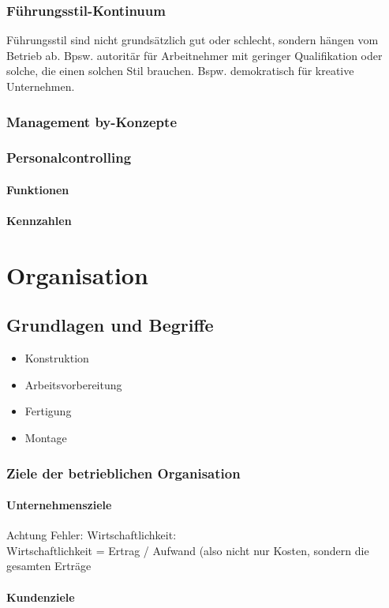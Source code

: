 \subsection{Führungsstil-Kontinuum}
Führungsstil sind nicht grundsätzlich gut oder schlecht, sondern hängen vom Betrieb ab. Bpsw. autoritär für Arbeitnehmer mit geringer Qualifikation oder solche, die einen solchen Stil brauchen. Bspw. demokratisch für kreative Unternehmen.
\subsection{Management by-Konzepte}
\subsection{Personalcontrolling}
\subsubsection{Funktionen}
\subsubsection{Kennzahlen}
\chapter{Organisation}
\section{Grundlagen und Begriffe}
\begin{itemize}
\item Konstruktion
\item Arbeitsvorbereitung
\item Fertigung
\item Montage
\end{itemize}
\subsection{Ziele der betrieblichen Organisation}
\subsubsection{Unternehmensziele}
Achtung Fehler: Wirtschaftlichkeit:\\
Wirtschaftlichkeit = Ertrag / Aufwand (also nicht nur Kosten, sondern die gesamten Erträge
\subsubsection{Kundenziele}
